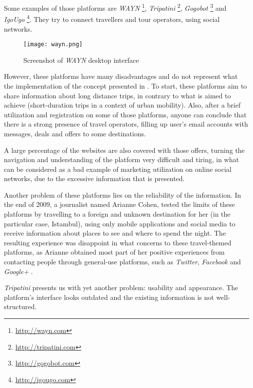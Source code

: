 Some examples of those platforms are \emph{WAYN} \footnote{\url{http://wayn.com}}, \emph{Tripatini} \footnote{\url{http://tripatini.com}}, \emph{Gogobot} \footnote{\url{http://gogobot.com}} and \emph{IgoUgo} \footnote{\url{http://igougo.com}}. They try to connect travellers and tour operators, using social networks.

\begin{figure}[h!]
  \begin{center}
    \leavevmode
    \texttt{[image: wayn.png]}
    \caption{Screenshot of \emph{WAYN} desktop interface}
    \label{fig:wayn}
  \end{center}
\end{figure}

However, these platforms have many disadvantages and do not represent what the implementation of the concept presented in \cite{kn:NGeCP11}. To start, these platforms aim to share information about long distance trips, in contrary to what is aimed to achieve (short-duration trips in a context of urban mobility).
Also, after a brief utilization and registration on some of those platforms, anyone can conclude that there is a strong presence of travel operators, filling up user's email accounts with messages, deals and offers to some destinations. 

A large percentage of the websites are also covered with those offers, turning the navigation and understanding of the platform very difficult and tiring, in what can be considered as a bad example of marketing utilization on online social networks, due to the excessive information that is presented.

Another problem of these platforms lies on the reliability of the information. In the end of 2009, a journalist named Arianne Cohen, tested the limits of these platforms by travelling to a foreign and unknown destination for her (in the particular case, Istambul), using only mobile applications and social media to receive information about places to see and where to spend the night. The resulting experience was disappoint in what concerns to these travel-themed platforms, as Arianne obtained most part of her positive experiences from contacting people through general-use platforms, such as \emph{Twitter}, \emph{Facebook} and \emph{Google+} \cite{kn:Coh10}.

\emph{Tripatini} presents us with yet another problem: usability and appearance. The platform's interface looks outdated and the existing information is not well-structured.

